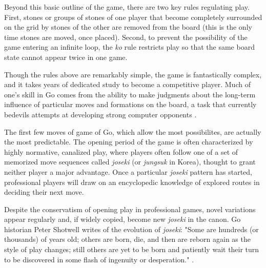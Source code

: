 \documentclass[reqno,12pt]{amsart}
\begin{document}
Beyond this basic outline of the game, there are two key rules regulating play. First, stones or groups of stones of one player that become completely surrounded on the grid by stones of the other are removed from the board (this is the only time stones are moved, once placed). Second, to prevent the possibility of the game entering an infinite loop, the \textit{ko} rule restricts play so that the same board state cannot appear twice in one game.

Though the rules above are remarkably simple, the game is fantastically complex, and it takes years of dedicated study to become a competitive player. Much of one's skill in Go comes from the ability to make judgments about the long-term influence of particular moves and formations on the board, a task that currently bedevils attempts at developing strong computer opponents \citep{rimmel2010current}.

The first few moves of game of Go, which allow the most possibilites, are actually the most predictable. The opening period of the game is often characterized by highly normative, canalized play, where players often follow one of a set of memorized move sequences called \textit{joseki} (or \textit{jungsuk} in Korea), thought to grant neither player a major advantage. Once a particular \textit{joseki} pattern has started, professional players will draw on an encyclopedic knowledge of explored routes in deciding their next move.

Despite the conservatism of opening play in professional games, novel variations appear regularly and, if widely copied, become new \textit{joseki} in the canon. Go historian Peter Shotwell writes of the evolution of \textit{joseki}: "Some are hundreds (or thousands) of years old; others are born, die, and then are reborn again as the style of play changes; still others are yet to be born and patiently wait their turn to be discovered in some flash of ingenuity or desperation." \citep{shotwell2011go}.
\end{document}

